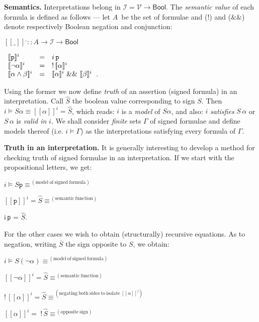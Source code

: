 \documentclass[a4paper,UKenglish]{lipics}
\newcounter{c}
\newcommand{\nentry}[1]{\noindent\textbf{#1}}
\newcommand{\lett}[1]{\texttt{#1}}
\newcommand{\formtype}{\ensuremath{A}}
\newcommand{\bnot}{\ensuremath{!}}
\newcommand{\band}{\ensuremath{\&\&}}
\newcommand{\mean}[1]{\ensuremath{\hat{#1}}}
\newcommand{\op}[1]{\ensuremath{\overline{#1}}}
\newcommand{\interprt}{\ensuremath{\mathcal{I}}}
\newcommand{\vars}{\ensuremath{\mathcal{V}}}
\newcommand{\bool}{\ensuremath{\mathsf{Bool}}}
\newcommand{\vval}[2]{\ensuremath{[\![ #1]\!]^{#2}}}
\newcommand{\sat}[2]{\ensuremath{#1\models#2}}
\begin{document}
\nentry{Semantics.} 
Interpretations belong in 
\interprt $= \vars \rightarrow \bool$. The \textit{semantic value} of each formula is defined as follows ---
let \formtype\ be the set of formulae and (\bnot) and (\band) denote respectively Boolean negation and conjunction:

$\vval{\_}{\_} :: \formtype \rightarrow \interprt \rightarrow \bool$

$\begin{array}[b]{lll}
\vval{\lett{p}}{i} & = & i\,\lett{p} \\
\vval{\neg\alpha}{i} & = & \bnot\,\vval{\alpha}{i} \\
\vval{\alpha\wedge\beta}{i} & = & \vval{\alpha}{i}\ \band\ \vval{\beta}{i}
\end{array}$.

 Using the former we now define \textit{truth} of an assertion (signed formula) in an interpretation. 
Call \mean{S} the boolean value corresponding to sign $S$. Then
$\sat{i}{S\alpha} \equiv \vval{\alpha}{i} = \mean{S}$,
\noindent which reads: $i$ is a \textit{model} of $S\alpha$, and also: $i$ \textit{satisfies} $S\,\alpha$ or $S\,\alpha$ is \textit{valid in} $i$.
We shall consider \emph{finite} sets $\Gamma$ of signed formulae and define models thereof (i.e. \sat{i}{\Gamma}) as the interpretations satisfying every formula of $\Gamma$.

\nentry{Truth in an interpretation.} 
It is generally interesting to develop a method for checking truth of signed formulae in an interpretation.
If we start with the propositional letters, we get:

$\sat{i}{S\lett{p}} 
\equiv^{\mathrm{\ (model\ of\ signed\ formula)}}$

$\vval{\lett{p}}{i} = \mean{S}
\equiv^{\mathrm{\ (semantic\ function)}}$

i\,\lett{p} = \mean{S}.

For the other cases we wish to obtain (structurally) recursive equations.
As to negation, writing \op{S} the sign opposite to $S$, we obtain:

$\sat{i}{S(\neg\alpha)} 
\equiv^{\mathrm{\ (model\ of\ signed\ formula)}}$

$\vval{\neg\alpha}{i} = \mean{S}
\equiv^{\mathrm{\ (semantic\ function)}}$

$\bnot\,\vval{\alpha}{i} = \mean{S}
\equiv^{\mathrm{\ (negating\ both\ sides\ to\ isolate\ \vval{\alpha}{i})}}$

$\vval{\alpha}{i} = \ \bnot\,\mean{S}
\equiv^{\mathrm{\ (opposite\ sign)}}$
\end{document}
